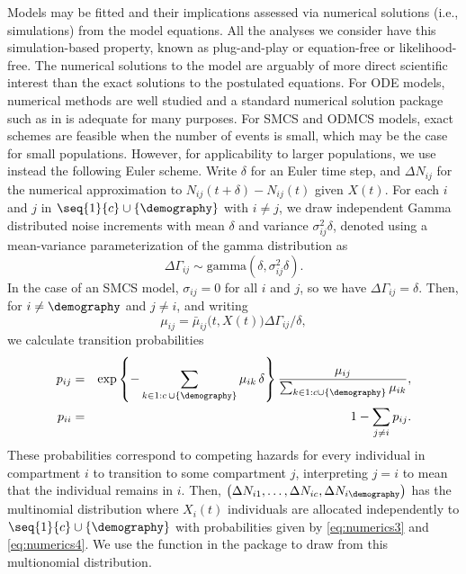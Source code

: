 Models may be fitted and their implications assessed via numerical solutions (i.e., simulations) from the model equations.
All the analyses we consider have this simulation-based property, known as plug-and-play or equation-free or likelihood-free.
The numerical solutions to the model are arguably of more direct scientific interest than the exact solutions to the postulated equations.
For ODE models, numerical methods are well studied and a standard numerical solution package such as  in  is adequate for many purposes.
For SMCS and ODMCS models, exact schemes are feasible when the number of events is small, which may be the case for small populations.
However, for applicability to larger populations, we use instead the following Euler scheme.
Write $\delta$ for an Euler time step, and $\Delta N_{ij}$ for the numerical approximation to $N_{ij}(t+\delta)-N_{ij}(t)$ given $X(t)$.
For each $i$ and $j$ in $\seq{1}{c} \cup \{\demography\}$ with $i \neq j$, we draw independent Gamma distributed noise increments with mean $\delta$ and variance $\sigma_{ij}^2 \delta$, denoted using a mean-variance parameterization of the gamma distribution as
\begin{equation}
\label{eq:numerics1}
\Delta\Gamma_{ij} \sim \mathrm{gamma}(\delta, \sigma_{ij}^2 \delta).
\end{equation}
In the case of an SMCS model, $\sigma_{ij}=0$ for all $i$ and $j$, so we have $\Delta\Gamma_{ij}=\delta$.
Then, for $i\neq \demography$ and $j\neq i$, and writing
\begin{equation}
\label{eq:numerics2}
\mu_{ij}=\bar\mu_{ij}\big(t,X(t)\big) \Delta\Gamma_{ij} / \delta,
\end{equation}
we calculate transition probabilities
\begin{eqnarray}
\label{eq:numerics3}
p_{ij} &=& \exp\left\{-\sum_{k\in 1:c \, \cup \{\demography\}} \mu_{ik} \, \delta \right\}
\frac{\mu_{ij}}{\sum_{k\in 1:c\cup \{\demography\}} \mu_{ik}},
\\
\label{eq:numerics4}
p_{ii} &=& 1 - \sum_{j\neq i} p_{ij}.
\end{eqnarray}
These probabilities correspond to competing hazards for every individual in compartment $i$ to transition to some compartment $j$, interpreting $j=i$ to mean that the individual remains in $i$.
Then, $\big(\Delta N_{i1},\dots,\Delta N_{ic},\Delta N_{i\demography}\big)$ has the multinomial distribution where $X_i(t)$ individuals are allocated independently to $\seq{1}{c}\cup\{\demography\}$ with probabilities given by \eqref{eq:numerics3} and \eqref{eq:numerics4}.
We use the  function in the  package to draw from this multionomial distribution.

